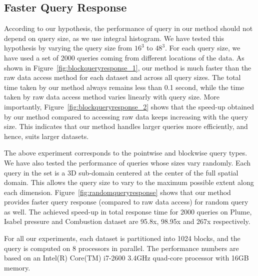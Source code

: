 \subsection{Faster Query Response}
\label{subsec:analysis_encoding_space}
According to our hypothesis, the performance of query in our method should not depend on query size, as we use integral histogram. We have tested this hypothesis by varying the query size from $16^3$ to $48^3$. For each query size, we have used a set of 2000 queries coming from different locations of the data. As shown in Figure~\ref{fig:blockqueryresponse_1}, our method is much faster than the raw data access method for each dataset and across all query sizes. The total time taken by our method always remains less than 0.1 second, while the time taken by raw data access method varies linearly with query size. More importantly, Figure~\ref{fig:blockqueryresponse_2} shows that the speed-up obtained by our method compared to accessing raw data keeps increasing with the query size. This indicates that our method handles larger queries more efficiently, and hence, suits larger datasets.

The above experiment corresponds to the pointwise and blockwise query types. We have also tested the performance of queries whose sizes vary randomly. Each query in the set is a 3D sub-domain centered at the center of the full spatial domain. This allows the query size to vary to the maximum possible extent along each dimension. Figure~\ref{fig:randomqueryresponse} shows that our method provides faster query response (compared to raw data access) for random query as well. The achieved speed-up in total response time for 2000 queries on Plume, Isabel pressure and Combustion dataset are 95.8x, 98.95x and 267x respectively. 

For all our experiments, each dataset is partitioned into 1024 blocks, and the query is computed on 8 processors in parallel. The performance numbers are based on an Intel(R) Core(TM) i7-2600 3.4GHz quad-core processor with 16GB memory.

